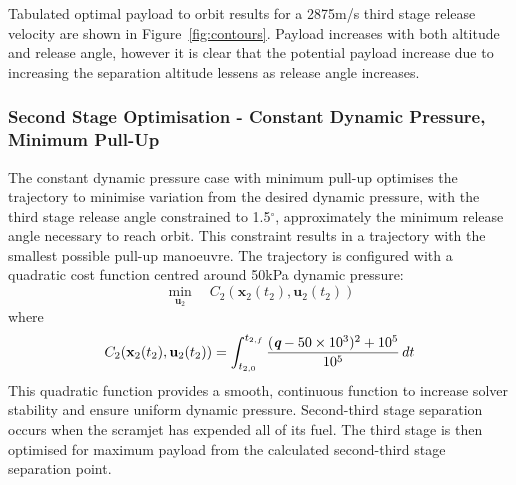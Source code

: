 \documentclass[]{aiaa-tc}
\begin{document}
	    Tabulated optimal payload to orbit results for a 2875m/s third stage release velocity are shown in Figure~\ref{fig:contours}. Payload increases with both altitude and release angle, however it is clear that the potential payload increase due to increasing the separation altitude lessens as release angle increases.  
	    
	 
	 
	 	 \subsubsection{Second Stage Optimisation - Constant Dynamic Pressure, Minimum Pull-Up}
	 	 
	 	 
	 	 The constant dynamic pressure case with minimum pull-up optimises the trajectory to minimise variation from the desired dynamic pressure, with the third stage release angle constrained to 1.5$^\circ$, approximately the minimum release angle necessary to reach orbit. This constraint results in a trajectory with the smallest possible pull-up manoeuvre. 
	 	 The trajectory is configured with a quadratic cost function centred around 50kPa dynamic pressure:
	 	 \begin{equation} 
	 	 \min\limits_{\textbf{u}_2} \quad C_2(\textbf{x}_{2}(t_2),\textbf{u}_{2}(t_2))
	 	 \end{equation}
	 	 where
	 	 \begin{equation}
	 	 C_2(\textbf{x}_{2}(t_2),\textbf{u}_{2}(t_2)) = \int_{t_{2,0}}^{t_{2,f}} \frac{(\textit{\textbf{q}}-50\times 10^3)^2+10^5}{10^5} \, dt
	 	 \end{equation}
	This quadratic function provides a smooth, continuous function to increase solver stability and ensure uniform dynamic pressure. Second-third stage separation occurs when the scramjet has expended all of its fuel.  The third stage is then optimised for maximum payload from the calculated second-third stage separation point. 
	 	 
\end{document}
